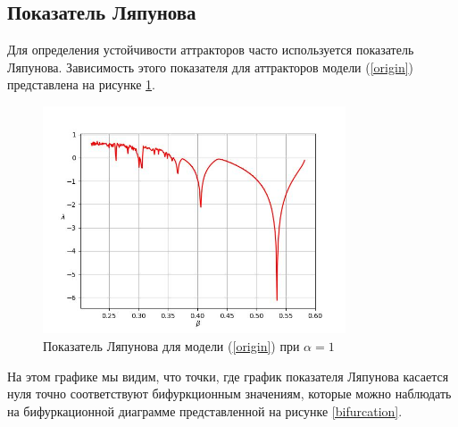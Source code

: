 \subsection{Показатель Ляпунова}    

    Для определения устойчивости аттракторов часто используется показатель Ляпунова. Зависимость этого показателя для аттракторов модели (\ref{origin}) представлена на рисунке \ref{lyapunov}. 

    \begin{figure}
        \centering
        \includegraphics[width=0.8\textwidth]{deterministic/images/lyapunov.jpg}

        \captionsetup{justification=centering}
        \caption{Показатель Ляпунова для модели (\ref{origin}) при \(\alpha = 1\)}
        \label{lyapunov}
    \end{figure}

    На этом графике мы видим, что точки, где график показателя Ляпунова касается нуля точно соответствуют бифуркционным значениям, которые можно наблюдать на бифуркационной диаграмме представленной на рисунке \ref{bifurcation}.